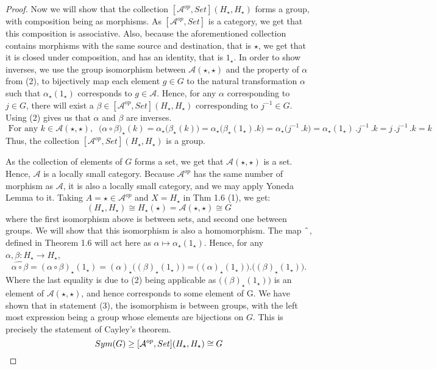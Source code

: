 \documentclass[18pt,a4paper]{article}
\theoremstyle{definition}
\begin{document}
\begin{proof}
		Now we will show that the collection $[\mathcal{A} ^{op},Set](H_\star, H_\star)$
		forms a group, with composition being as morphisms.
		As $[\mathcal{A} ^{op},Set]$ is a category, we get that
		this composition is associative. Also, because the aforementioned collection contains
		morphisms with the same source and destination, that is $\star$, we get that it is
		closed under composition, and has an identity, that is $1_\star$.
		In order to show inverses, we use the group isomorphism between
		$\mathcal{A} (\star,\star)$ and	the property of $\alpha$ from (2),
		to bijectively map each element $g\in G$ to the natural transformation $\alpha$
		such that $\alpha_\star(1_\star)$ corresponds to $g \in \mathcal{A}$.
		Hence, for any $\alpha$ corresponding to $j\in G$, there will exist a
		$\beta \in [\mathcal{A} ^{op},Set](H_\star, H_\star)$ corresponding to $j^{-1} \in G$.
		Using (2) gives us that $\alpha$ and $\beta$ are inverses.
		\[ \text{ For any } k \in \mathcal{A} (\star,\star), \; \;
			\big( \alpha \circ \beta\big)_\star
			(k)
		= \alpha_\star\big(\beta_\star(k)\big)=\alpha_\star \big( \beta_\star(1_\star).k \big)
	=\alpha_\star \big( j^{-1}\,. k \big) = \alpha_\star(1_\star)\,.  j^{-1}\,. k=j\,. j^{-1}\,.
k=k\]
		Thus, the collection $[ \mathcal{A} ^{op}, Set](H_\star,H_\star)$ is a group.

		As the collection of elements of $G$ forms a set, we get that $\mathcal{A}(\star,\star)$
		is a set. Hence, $\mathcal{A}$ is a locally small category. Because
		$\mathcal{A} ^{op}$ has the same number of morphism as $\mathcal{A}$,
		it is also a locally small category, and we may apply Yoneda Lemma to it.
		Taking $A=\star	\in \mathcal{A} ^{op}$ and $X=H_\star$ in Thm 1.6 (1), we get:
		\begin{equation} [ \mathcal{A} ^{op}, Set](H_\star,H_\star) \cong H_\star(\star)
		= \mathcal{A} (\star,\star) \cong G\end{equation}
		where the first isomorphism above is between sets, and second one between groups.
		We will show that this isomorphism is also a homomorphism.
		The map $\string ^$, defined in Theorem 1.6 will act here as $\alpha
		\mapsto \alpha_\star (1_\star)$. Hence, for any $\alpha,\beta:H_\star
		\to H_\star$,
		\begin{equation}
			\widehat {\alpha \circ \beta}= (\alpha \circ \beta)_\star(1_\star)
			=(\alpha)_\star \Big( (\beta)_\star (1_\star) \Big)=
			\Big((\alpha)_\star(1_\star) \Big) . \Big( (\beta)_\star (1_\star) \Big).
		\end{equation}
		Where the last equality is due to (2) being applicable
		as $\Big((\beta)_\star (1_\star)\Big)$ is an element of $\mathcal{A} (\star,\star)$,
		and hence corresponds to some element of G.
		We have shown that in statement (3), the isomorphism is between groups,
		with the left most expression being a group whose elements are bijections
		on $G$. This is
		precisely the statement of Cayley's theorem.
		\[ Sym(G) \geq [ \mathcal{A} ^{op}, Set](H_\star,H_\star) \cong G \qedhere \]
	\end{proof}
\end{document}
